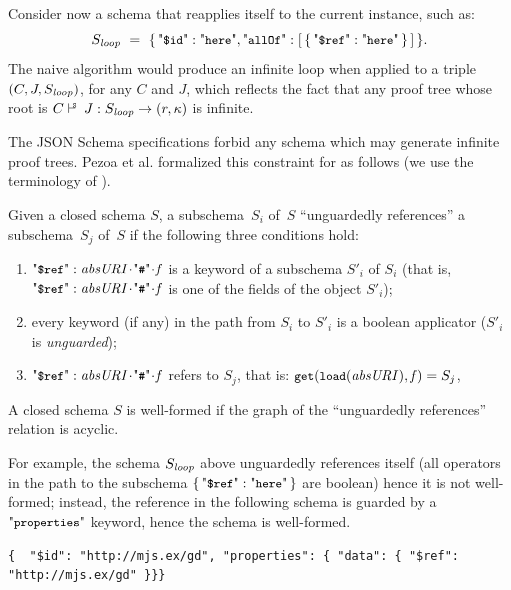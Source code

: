 Consider now a schema that reapplies itself to the current instance, such as:
$$S_{\key{loop}}\ =\ \JObj{\qdid: \qkw{here}, \qall : \JArr { \JObj { \qdref : \qkw{here}} } }.$$
The naive algorithm would produce an infinite loop when applied to a triple $(C,J,S_{\mathit{loop}})$, for any $C$ and
$J$, which reflects the fact that any proof tree whose root is $\SJudg{C}{J}{S_{\key{loop}}}\Ret{r}(r,\ps)$ is infinite.

The JSON Schema specifications forbid any schema which may generate infinite proof trees.
Pezoa et al. \citep{DBLP:conf/www/PezoaRSUV16} formalized this constraint for {\cJS} as follows
(we use the terminology of \citep{DBLP:journals/pvldb/AttoucheBCGSS22}). 


\begin{definition}\label{def:urc}
Given a closed {\cJS} schema $S$, %
a subschema~$S_i$ of~$S$ ``unguardedly references'' a subschema~$S_j$ of~$S$ if
the following three conditions hold:
\begin{enumerate}
\item $\qdref :  \key{absURI}\catHash\key{f}$ is a keyword of a subschema $S'_i$ of $S_i$
  (that is,  $\qdref :  \key{absURI}\catHash\key{f}$ is one of the fields of the object $S'_i$);
\item  every keyword (if any) in the path from $S_i$ to $S'_i$ is a boolean applicator ($S'_i$ is \emph{unguarded});
\item  $\qdref :  \key{absURI}\catHash\key{f}$ refers to $S_j$, that is: $\mbox{\tt{\small get}}(\mbox{\tt{\small load}}(\mathit{absURI}),\mathit{f}) = S_j$,
\end{enumerate}
A closed schema $S$ is well-formed if the graph of the ``unguardedly references'' relation %
is acyclic.
\end{definition}

For example, the schema $S_{\mathit{loop}}$ above unguardedly references itself
(all operators in the path %
to the subschema $\JObj { \qdref : \qkw{here}}$ are boolean)
 hence it is not well-formed;
instead, the reference in the following schema
is guarded by a $\qprops$ keyword, hence the schema is well-formed.

\begin{querybox}{}
\begin{lstlisting}[style=query,escapechar=Z]
{  "$id": "http://mjs.ex/gd", "properties": { "data": { "$ref": "http://mjs.ex/gd" }}}
\end{lstlisting}
\end{querybox}

